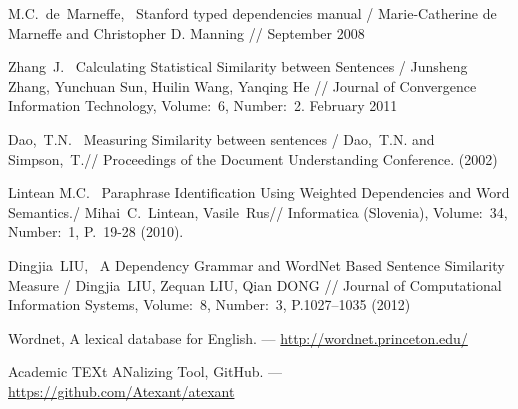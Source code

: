 M.C.~de~Marneffe,~
Stanford typed dependencies manual /
Marie-Catherine de Marneffe and Christopher D. Manning //
September 2008

Zhang~J.~
Calculating Statistical Similarity between Sentences /
Junsheng Zhang, Yunchuan Sun, Huilin Wang, Yanqing He //
Journal of Convergence Information Technology,
Volume:~6, Number:~2. February 2011

Dao,~T.N.~
Measuring Similarity between sentences /
Dao,~T.N. and Simpson,~T.//
Proceedings of the Document Understanding Conference. (2002) 

Lintean M.C.~
Paraphrase Identification Using Weighted Dependencies and Word Semantics./
Mihai~C.~Lintean, Vasile~Rus//
Informatica (Slovenia),
Volume:~34, Number:~1, P.~19-28 (2010).

Dingjia~LIU,~
A Dependency Grammar and WordNet Based Sentence Similarity Measure /
Dingjia~LIU, Zequan LIU, Qian DONG //
Journal of Computational Information Systems, 
Volume:~8, Number:~3, P.1027–1035 (2012)

Wordnet, A lexical database for English. ---
\url{http://wordnet.princeton.edu/}

Academic TEXt ANalizing Tool, GitHub. ---~
\url{https://github.com/Atexant/atexant}
